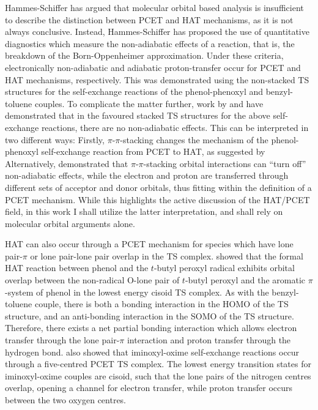 Hammes-Schiffer has argued that molecular orbital based analysis is insufficient
to describe the distinction between PCET and HAT mechanisms, as it is not always
conclusive.\cite{Skone2006, HammesSchiffer2015} Instead, Hammes-Schiffer has
proposed the use of quantitative diagnostics which measure the non-adiabatic
effects of a reaction, that is, the breakdown of the Born-Oppenheimer
approximation.\cite{Sirjoosingh2011, HammesSchiffer2015} Under these criteria,
electronically non-adiabatic and adiabatic proton-transfer occur for PCET and
HAT mechanisms, respectively. This was demonstrated using the non-stacked TS
structures for the self-exchange reactions of the phenol-phenoxyl and
benzyl-toluene couples. To complicate the matter further, work by
\citet{Inagaki2011} and \citet{MunozRugeles2017} have demonstrated that in the
favoured stacked TS structures for the above self-exchange reactions, there are
no non-adiabatic effects. This can be interpreted in two different ways:
Firstly, $\pi$-$\pi$-stacking changes the mechanism of the phenol-phenoxyl
self-exchange reaction from PCET to HAT, as suggested by \citet{Inagaki2011}
Alternatively, \citet{MunozRugeles2017} demonstrated that $\pi$-$\pi$-stacking
orbital interactions can ``turn off'' non-adiabatic effects, while the electron
and proton are transferred through different sets of acceptor and donor orbitals,
thus fitting within the definition of a PCET mechanism. While this highlights
the active discussion of the HAT/PCET field, in this work I shall utilize the
latter interpretation, and shall rely on molecular orbital arguments alone.

HAT can also occur through a PCET mechanism for species which have lone
pair-$\pi$ or lone pair-lone pair overlap in the TS complex.\cite{DiLabio2007,
DiLabio2005} \citet{DiLabio2007} showed that the formal HAT reaction between
phenol and the $t$-butyl peroxyl radical exhibits orbital overlap between the
non-radical O-lone pair of $t$-butyl peroxyl and the aromatic $\pi$-system of
phenol in the lowest energy cisoid TS complex. As with the benzyl-toluene
couple, there is both a bonding interaction in the HOMO of the TS structure, and
an anti-bonding interaction in the SOMO of the TS structure. Therefore, there
exists a net partial bonding interaction which allows electron transfer through
the lone pair-$\pi$ interaction and proton transfer through the hydrogen bond.
\citet{DiLabio2005} also showed that iminoxyl-oxime self-exchange reactions
occur through a five-centred PCET TS complex. The lowest energy transition
states for iminoxyl-oxime couples are cisoid, such that the lone pairs of the
nitrogen centres overlap, opening a channel for electron transfer, while proton
transfer occurs between the two oxygen centres.

